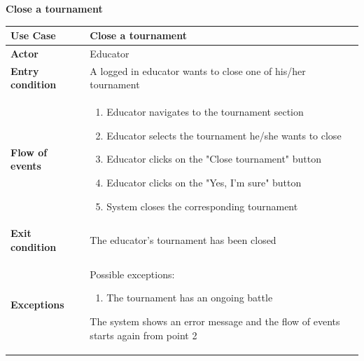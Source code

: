 \documentclass[../RASD.tex]{subfiles}
\begin{document}
        \textbf{Close a tournament}
        \begin{table}[ht]
            \begin{center}
                \begin{tabular}{|m{10em}|m{30em}|}
                \hline
                \textbf{Use Case} & Close a tournament\\
                \hline
                \textbf{Actor} & Educator\\
                \hline
                \textbf{Entry condition} & A logged in educator wants to close one of his/her tournament\\
                \hline
                \textbf{Flow of events} & 
                    \begin{enumerate}
                        \item Educator navigates to the tournament section \item Educator selects the tournament he/she wants to close
                        \item Educator clicks on the "Close tournament" button
                        \item Educator clicks on the "Yes, I'm sure" button
                        \item System closes the corresponding tournament
                    \end{enumerate}\\
                \hline
                \textbf{Exit condition} & The educator's tournament has been closed\\
                \hline
                \textbf{Exceptions} & 
                    Possible exceptions:
                    \begin{enumerate}
                        \item The tournament has an ongoing battle
                    \end{enumerate}
                    The system shows an error message and the flow of events starts again from point 2\\
                \hline
                \end{tabular}
            \end{center}
        \end{table}\newpage

\end{document}
